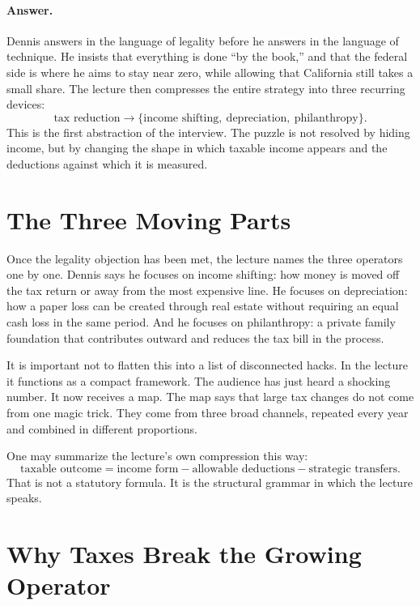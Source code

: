 \paragraph{Answer.} Dennis answers in the language of legality before he answers in the language of technique. He insists that everything is done ``by the book,'' and that the federal side is where he aims to stay near zero, while allowing that California still takes a small share. The lecture then compresses the entire strategy into three recurring devices:
\begin{equation}
\text{tax reduction}
\to
\{\text{income shifting},\ \text{depreciation},\ \text{philanthropy}\}.
\end{equation}
This is the first abstraction of the interview. The puzzle is not resolved by hiding income, but by changing the shape in which taxable income appears and the deductions against which it is measured.

\section{The Three Moving Parts}

Once the legality objection has been met, the lecture names the three operators one by one. Dennis says he focuses on income shifting: how money is moved off the tax return or away from the most expensive line. He focuses on depreciation: how a paper loss can be created through real estate without requiring an equal cash loss in the same period. And he focuses on philanthropy: a private family foundation that contributes outward and reduces the tax bill in the process.

It is important not to flatten this into a list of disconnected hacks. In the lecture it functions as a compact framework. The audience has just heard a shocking number. It now receives a map. The map says that large tax changes do not come from one magic trick. They come from three broad channels, repeated every year and combined in different proportions.

One may summarize the lecture's own compression this way:
\begin{equation}
\text{taxable outcome}
=
\text{income form}
-
\text{allowable deductions}
-
\text{strategic transfers}.
\end{equation}
That is not a statutory formula. It is the structural grammar in which the lecture speaks.

\section{Why Taxes Break the Growing Operator}

